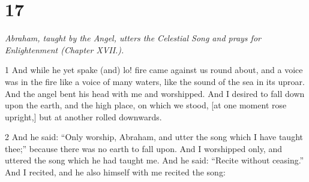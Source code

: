 \chapter{17}

\par \textit{Abraham, taught by the Angel, utters the Celestial Song and prays for Enlightenment (Chapter XVII.).}

\par 1 And while he yet spake (and) lo! fire came against us round about, and a voice was in the fire like a voice of many waters, like the sound of the sea in its uproar. And the angel bent his head with me and worshipped. And I desired to fall down upon the earth, and the high place, on which we stood, [at one moment rose upright,] but at another rolled downwards. 

\par 2 And he said: “Only worship, Abraham, and utter the song which I have taught thee;” because there was no earth to fall upon. And I worshipped only, and uttered the song which he had taught me. And he said: “Recite without ceasing.” And I recited, and he also himself with me recited the song: 

